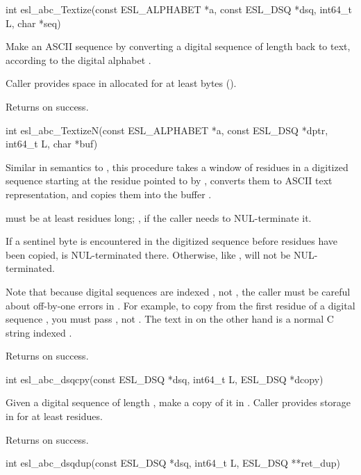 \begin{sreapi}
\hypertarget{func:esl_abc_Textize()}
{\item[int esl\_abc\_Textize(const ESL\_ALPHABET *a, const ESL\_DSQ *dsq, int64\_t L, char *seq)]}

Make an ASCII sequence  by converting a digital
sequence  of length  back to text, according to
the digital alphabet . 

Caller provides space in  allocated for at least
 bytes ().

Returns  on success.


\hypertarget{func:esl_abc_TextizeN()}
{\item[int esl\_abc\_TextizeN(const ESL\_ALPHABET *a, const ESL\_DSQ *dptr, int64\_t L, char *buf)]}

Similar in semantics to , this procedure takes
a window of  residues in a digitized sequence
starting at the residue pointed to by ,
converts them to ASCII text representation, and 
copies them into the buffer .

 must be at least  residues long; , if the
caller needs to NUL-terminate it.

If a sentinel byte is encountered in the digitized
sequence before  residues have been copied,  is
NUL-terminated there. Otherwise, like , 
will not be NUL-terminated.

Note that because digital sequences are indexed ,
not , the caller must be careful about
off-by-one errors in . For example, to copy from
the first residue of a digital sequence , you must
pass , not . The text in 
on the other hand is a normal C string indexed .

Returns  on success.


\hypertarget{func:esl_abc_dsqcpy()}
{\item[int esl\_abc\_dsqcpy(const ESL\_DSQ *dsq, int64\_t L, ESL\_DSQ *dcopy)]}

Given a digital sequence  of length ,
make a copy of it in . Caller provides
storage in  for at least  
residues.

Returns  on success.


\hypertarget{func:esl_abc_dsqdup()}
{\item[int esl\_abc\_dsqdup(const ESL\_DSQ *dsq, int64\_t L, ESL\_DSQ **ret\_dup)]}


\end{sreapi}
